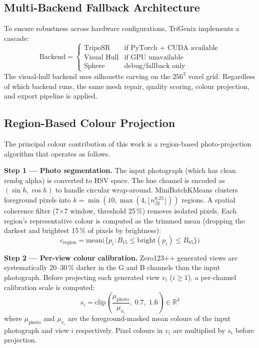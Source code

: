 ﻿\documentclass[conference]{IEEEtran}
\begin{document}
\subsection{Multi-Backend Fallback Architecture}

To ensure robustness across hardware configurations, TriGenix implements a cascade:
\begin{equation}
\text{Backend} = \begin{cases}
\text{TripoSR} & \text{if PyTorch + CUDA available} \\
\text{Visual Hull} & \text{if GPU unavailable} \\
\text{Sphere} & \text{debug/fallback only}
\end{cases}
\end{equation}
The visual-hull backend uses silhouette carving on the $256^3$ voxel grid. Regardless of which backend runs,
the same mesh repair, quality scoring, colour projection, and export pipeline is applied.

\subsection{Region-Based Colour Projection}

The principal colour contribution of this work is a region-based photo-projection algorithm that operates as follows.

\textbf{Step 1 — Photo segmentation.}
The input photograph (which has clean rembg alpha) is converted to HSV space. The hue channel is
encoded as $(\sin h, \cos h)$ to handle circular wrap-around. MiniBatchKMeans clusters foreground pixels
into $k = \min(10, \max(4, \lfloor n_{fg}^{0.25} \rfloor))$ regions. A spatial coherence filter (7$\times$7
window, threshold 25\,\%) removes isolated pixels. Each region's representative colour is computed as the
trimmed mean (dropping the darkest and brightest 15\,\% of pixels by brightness):
\begin{equation}
c_{\text{region}} = \text{mean}\bigl(\{p_i : B_{15} \le \mathrm{bright}(p_i) \le B_{85}\}\bigr)
\end{equation}

\textbf{Step 2 — Per-view colour calibration.}
Zero123++ generated views are systematically 20--30\,\% darker in the G and B channels than the input photograph.
Before projecting each generated view $v_i$ ($i \ge 1$), a per-channel calibration scale is computed:
\begin{equation}
s_i = \mathrm{clip}\!\left(\frac{\mu_{\text{photo}}}{\mu_{v_i}},\; 0.7,\; 1.6\right) \in \mathbb{R}^3
\end{equation}
where $\mu_{\text{photo}}$ and $\mu_{v_i}$ are the foreground-masked mean colours of the input photograph
and view $i$ respectively. Pixel colours in $v_i$ are multiplied by $s_i$ before projection.
\end{document}
